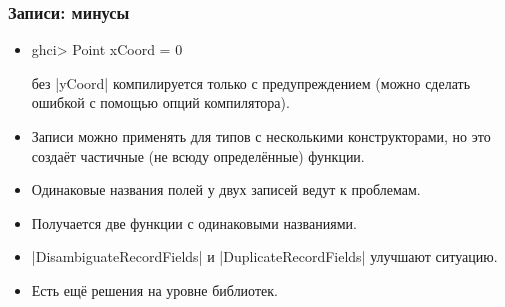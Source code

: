 \documentclass[10pt]{beamer}
\begin{document}
\begin{frame}[fragile]
  \frametitle{Записи: минусы}\hypertarget{rec2}{}
  \hyperlink{rec1}{}
  \begin{itemize}
    \item
          \begin{haskell}
ghci> Point { xCoord = 0 }
\end{haskell}
          \pause
          без \haskinline|yCoord| компилируется только с предупреждением (можно сделать ошибкой с помощью опций компилятора).
          \pause
    \item Записи можно применять для типов с несколькими конструкторами, но это создаёт частичные (не всюду определённые) функции.
          \pause
    \item Одинаковые названия полей у двух записей ведут к проблемам.
          \pause
    \item Получается две функции с одинаковыми названиями.
    \item \haskinline|DisambiguateRecordFields| и \haskinline|DuplicateRecordFields| улучшают ситуацию.
          \pause
    \item Есть ещё решения на уровне библиотек.
  \end{itemize}
\end{frame}
\end{document}
